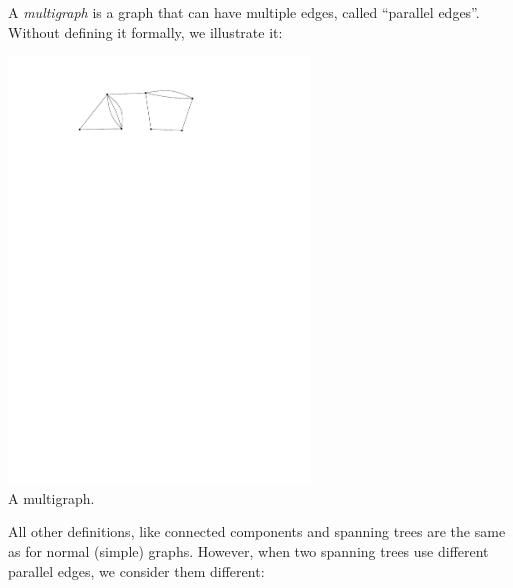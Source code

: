 \documentclass[11pt,a4paper,oneside]{article}
\begin{document}
\section*{}
A {\em multigraph} is a graph that can have multiple edges, called
``parallel edges''. Without defining 
it formally, we illustrate it:
\begin{center}
	\includegraphics[width=0.6\textwidth]{figures/multigraph.pdf}\\
	A multigraph.
\end{center}
All other definitions, like connected components and spanning trees
are the same as for normal (simple) graphs. However,
when two spanning trees use different parallel edges, we consider them
different:
\end{document}
